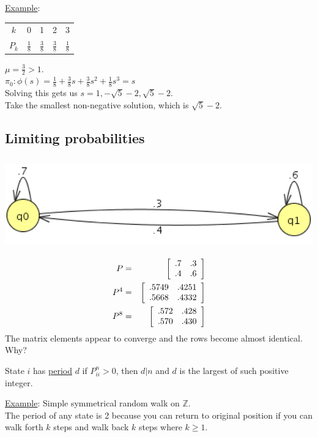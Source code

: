   \noindent\underline{Example}:
    \begin{tabular}{c | c c c c}
      $k$ & 0 & 1 & 2 & 3\\
      $P_k$& $\frac{1}{8}$ & $\frac{3}{8}$ & $\frac{3}{8}$ & $\frac{1}{8}$
    \end{tabular}
    $\mu = \frac{3}{2} > 1$.\\
    $\pi_0 : \phi(s) = \frac{1}{8} + \frac{3}{8}s + \frac{3}{8}s^2 + 
      \frac{1}{8}s^3 = s$\\
    Solving this gets us $s = 1, -\sqrt{5} - 2, \sqrt{5} - 2$.\\
    Take the smallest non-negative solution, which is $\sqrt{5} - 2$.\\

  \subsection*{Limiting probabilities}
    \includegraphics[height=40mm]{5_6.png}
    \begin{eqnarray*}
      P & = & \left[\begin{array}{c c}
        .7 & .3\\
        .4 & .6
      \end{array}\right]\\
      P^4 & = & \left[\begin{array}{c c}
        .5749 & .4251\\
        .5668 & .4332
      \end{array}\right]\\
      P^8 & = & \left[\begin{array}{c c}
        .572 & .428\\
        .570 & .430
      \end{array}\right]\\
    \end{eqnarray*}
    The matrix elements appear to converge and the rows become almost 
    identical. Why?\\
    \begin{definition}
      State $i$ has \underline{period} $d$ if $P^{n}_{ii} > 0$, then $d | n$ and
      $d$ is the largest of such positive integer.
    \end{definition}
    \noindent\underline{Example}: Simple symmetrical random walk on $\mathbb{Z}$.\\
      The period of any state is 2 because you can return to original position 
      if you can walk forth $k$ steps and walk back $k$ steps where $k \ge 1$.\\

